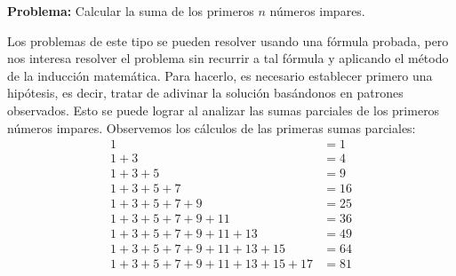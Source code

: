 \noindent\textbf{\selectfont\color{black}Problema:\hspace{5pt plus 1pt minus 1pt}} Calcular la suma de los primeros $n$ números impares.

\solucion Los problemas de este tipo se pueden resolver usando una fórmula probada, pero nos interesa resolver el problema sin recurrir a tal fórmula y aplicando el método de la inducción matemática. Para hacerlo, es necesario establecer primero una hipótesis, es decir, tratar de adivinar la solución basándonos en patrones observados. Esto se puede lograr al analizar las sumas parciales de los primeros números impares. Observemos los cálculos de las primeras sumas parciales:
\begin{align*}
    1 & = 1 \\
    1 + 3 & = 4 \\
    1 + 3 + 5 & = 9 \\
    1 + 3 + 5 + 7 & = 16 \\
    1 + 3 + 5 + 7 + 9 & = 25 \\
    1 + 3 + 5 + 7 + 9 + 11 & = 36 \\
    1 + 3 + 5 + 7 + 9 + 11 + 13 & = 49 \\
    1 + 3 + 5 + 7 + 9 + 11 + 13 + 15 & = 64 \\
    1 + 3 + 5 + 7 + 9 + 11 + 13 + 15 + 17 & = 81
\end{align*}\newpage
